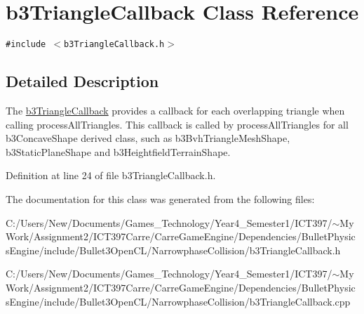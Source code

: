 \hypertarget{classb3_triangle_callback}{
\section{b3TriangleCallback Class Reference}
\label{classb3_triangle_callback}
}
{\tt \#include $<$b3TriangleCallback.h$>$}



\subsection{Detailed Description}
The \hyperlink{classb3_triangle_callback}{b3TriangleCallback} provides a callback for each overlapping triangle when calling processAllTriangles. This callback is called by processAllTriangles for all b3ConcaveShape derived class, such as b3BvhTriangleMeshShape, b3StaticPlaneShape and b3HeightfieldTerrainShape. 

Definition at line 24 of file b3TriangleCallback.h.

The documentation for this class was generated from the following files:\begin{CompactItemize}
\item 
C:/Users/New/Documents/Games\_\-Technology/Year4\_\-Semester1/ICT397/$\sim$My Work/Assignment2/ICT397Carre/CarreGameEngine/Dependencies/BulletPhysicsEngine/include/Bullet3OpenCL/NarrowphaseCollision/b3TriangleCallback.h\item 
C:/Users/New/Documents/Games\_\-Technology/Year4\_\-Semester1/ICT397/$\sim$My Work/Assignment2/ICT397Carre/CarreGameEngine/Dependencies/BulletPhysicsEngine/include/Bullet3OpenCL/NarrowphaseCollision/b3TriangleCallback.cpp\end{CompactItemize}
